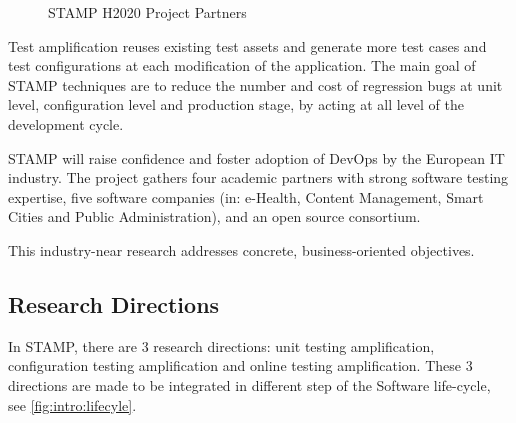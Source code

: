 \begin{figure}
	\centering
	\caption{STAMP H2020 Project Partners}
	\label{fig:intro:partners-map}
\end{figure}

Test amplification reuses existing test assets and generate more test cases and test configurations at each modification of the application.
The main goal of STAMP techniques are to reduce the number and cost of regression bugs at unit level, configuration level and production stage, by acting at all level of the development cycle.

STAMP will raise confidence and foster adoption of DevOps by the European IT industry.
The project gathers four academic partners with strong software testing expertise, five software companies (in: e-Health, Content Management, Smart Cities and Public Administration), and an open source consortium. 

This industry-near research addresses concrete, business-oriented objectives.

\subsection{Research Directions}
\label{subsec:intro:research-directions}

In STAMP, there are 3 research directions: unit testing amplification, configuration testing amplification and online testing amplification.
These 3 directions are made to be integrated in different step of the Software life-cycle, see \autoref{fig:intro:lifecyle}.

